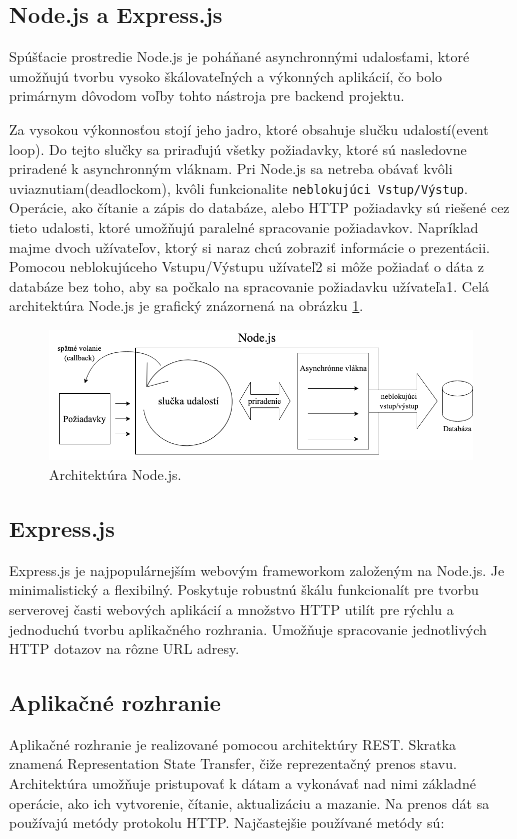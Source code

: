 \subsection{Node.js a Express.js}
\label{node}
Spúšťacie prostredie Node.js\cite{nodejs} je poháňané asynchronnými udalosťami, ktoré umožňujú tvorbu vysoko škálovateľných a výkonných aplikácií, čo bolo primárnym dôvodom voľby tohto nástroja pre backend projektu.

Za vysokou výkonnosťou stojí jeho jadro, ktoré obsahuje slučku udalostí(event loop). Do tejto slučky sa priraďujú všetky požiadavky, ktoré sú nasledovne priradené k asynchronným vláknam. Pri Node.js sa netreba obávať kvôli uviaznutiam(deadlockom), kvôli funkcionalite \texttt{neblokujúci Vstup/Výstup}. Operácie, ako čítanie a zápis do databáze, alebo HTTP požiadavky sú riešené cez tieto udalosti, ktoré umožňujú paralelné spracovanie požiadavkov. Napríklad majme dvoch užívateľov, ktorý si naraz chcú zobraziť informácie o prezentácii. Pomocou neblokujúceho Vstupu/Výstupu užívateľ2 si môže požiadať o dáta z databáze bez toho, aby sa počkalo na spracovanie požiadavku užívateľa1. Celá architektúra Node.js je grafický znázornená na obrázku \ref{pic:nodejs}.

    \begin{figure}[!hbt]
        \centering
        \includegraphics[scale=0.5]{obrazky/nodejs.png}
        \caption{Architektúra Node.js.}
        \label{pic:nodejs}
    \end{figure}
    
\subsection*{Express.js}
\label{express}
Express.js\cite{expressjs} je najpopulárnejším webovým frameworkom založeným na Node.js. Je minimalistický a flexibilný. Poskytuje robustnú škálu funkcionalít pre tvorbu serverovej časti webových aplikácií a množstvo HTTP utilít pre rýchlu a jednoduchú tvorbu aplikačného rozhrania. Umožňuje spracovanie jednotlivých HTTP dotazov na rôzne URL adresy.

\subsection{Aplikačné rozhranie}
\label{api}
Aplikačné rozhranie je realizované pomocou architektúry REST. Skratka znamená Representation State Transfer, čiže reprezentačný prenos stavu. Architektúra umožňuje pristupovať k dátam a vykonávať nad nimi základné operácie, ako ich vytvorenie, čítanie, aktualizáciu a mazanie. Na prenos dát sa používajú metódy protokolu HTTP. Najčastejšie používané metódy sú:

